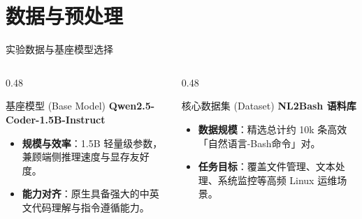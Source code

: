 \documentclass[aspectratio=169]{beamer}
\begin{document}
\section{数据与预处理}

\begin{frame}{实验数据与基座模型选择}
    \begin{columns}[T]
        \begin{column}{0.48\textwidth}
            \begin{block}{基座模型 (Base Model)}
                \textbf{Qwen2.5-Coder-1.5B-Instruct}
                \begin{itemize}
                    \item \textbf{规模与效率}：1.5B 轻量级参数，兼顾端侧推理速度与显存友好度。
                    \item \textbf{能力对齐}：原生具备强大的中英文代码理解与指令遵循能力。
                \end{itemize}
            \end{block}
        \end{column}
        
        \begin{column}{0.48\textwidth}
            \begin{block}{核心数据集 (Dataset)}
                \textbf{NL2Bash 语料库}\footnotemark
                \begin{itemize}
                    \item \textbf{数据规模}：精选总计约 10k 条高效「自然语言-Bash命令」对。
                    \item \textbf{任务目标}：覆盖文件管理、文本处理、系统监控等高频 Linux 运维场景。
                \end{itemize}
            \end{block}
        \end{column}
    \end{columns}
    
\end{frame}
\end{document}
